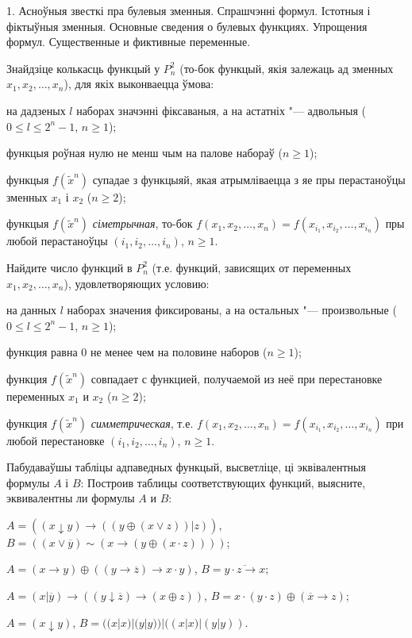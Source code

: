 \documentclass[12pt, a4paper]{article}
\begin{document}
\biLangHeader
{1. Асноўныя звесткі пра булевыя зменныя. Спрашчэнні формул. Істотныя і фіктыўныя зменныя.}
{Основные сведения о булевых функциях. Упрощения формул. Существенные и фиктивные переменные.}

\begin{problemList}

\problemItemSimple
{%
Знайдзіце колькасць функцый у $P^2_n$ (то-бок функцый, якія залежаць ад зменных $x_1, x_2, \ldots, x_n$), для якіх выконваецца ўмова:
\begin{belarusianEnumerate}
    \item на дадзеных $l$ наборах значэнні фіксаваныя, а на астатніх "--- адвольныя ($0 \le l \le 2^n - 1$, $n \ge 1$);
    \item функцыя роўная нулю не менш чым на палове набораў ($n \ge 1$);
    \item функцыя $f(\tilde x^n)$ супадае з функцыяй, якая атрымліваецца з яе пры перастаноўцы зменных $x_1$ і $x_2$ ($n \ge 2$);
    \item функцыя $f(\tilde x^n)$ \textit{сіметрычная}, то-бок $f(x_1, x_2, \ldots, x_n) = f(x_{i_1}, x_{i_2}, \ldots, x_{i_n})$ пры любой перастаноўцы $(i_1, i_2, \ldots, i_n)$, $n \ge 1$.
\end{belarusianEnumerate}
}
{%
Найдите число функций в $P^2_n$ (т.е. функций, зависящих от переменных $x_1, x_2, \ldots, x_n$), удовлетворяющих условию:
\begin{russianEnumerate}
    \item на данных $l$ наборах значения фиксированы, а на остальных "--- произвольные ($0 \le l \le 2^n - 1$, $n \ge 1$);
    \item функция равна 0 не менее чем на половине наборов ($n \ge 1$);
    \item функция $f(\tilde x^n)$ совпадает с функцией, получаемой из неё при перестановке переменных $x_1$ и $x_2$ ($n \ge 2$);
    \item функция $f(\tilde x^n)$ \textit{симметрическая}, т.е. $f(x_1, x_2, \ldots, x_n) = f(x_{i_1}, x_{i_2}, \ldots, x_{i_n})$ при любой перестановке $(i_1, i_2, \ldots, i_n)$, $n \ge 1$.
\end{russianEnumerate}
}

\bigskip

\problemItemWithCommonPart
{Пабудаваўшы табліцы адпаведных функцый, высветліце, ці эквівалентныя формулы $A$ і  $B$:}
{Построив таблицы соответствующих функций, выясните, эквивалентны ли формулы $A$ и $B$:}
{%
\begin{belarusianEnumerate}
    \item $A=((x\downarrow y)\rightarrow ((y\oplus (x \vee z))|z))$, $B=((x\vee \overline{y})\sim (x\rightarrow (y \oplus (x\cdot z))))$;
    \item $A=(x\rightarrow y)\oplus((y\rightarrow \overline{z})\rightarrow x\cdot y)$, $B=\overline{y\cdot z\rightarrow x}$;
    \item $A=(x|\overline{y})\rightarrow((y\downarrow \overline{z})\rightarrow(x\oplus z))$, $B=x\cdot(y\cdot z)\oplus(\overline{x} \rightarrow z)$;
    \item $A=(x\downarrow y)$, $B=((x|x)|(y|y))|((x|x)|(y|y))$.
\end{belarusianEnumerate}
}


\end{problemList}
\end{document}
